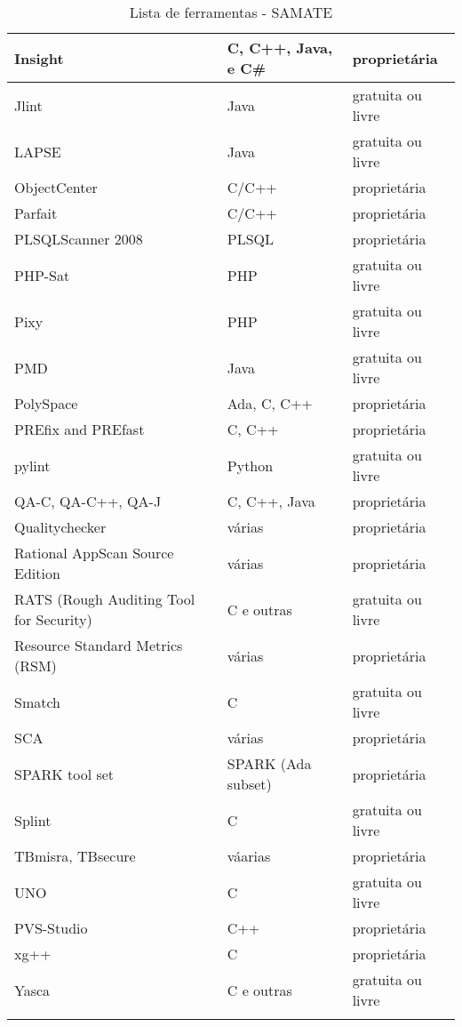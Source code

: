 \begin{center}
\begin{longtable}{ l | l | l }
Insight &   C, C++, Java, e C\#  & proprietária \\ \hline
Jlint &   Java  & gratuita ou livre \\ \hline
LAPSE &   Java  & gratuita ou livre \\ \hline
ObjectCenter &  C/C++  & proprietária \\ \hline
Parfait &   C/C++  & proprietária \\ \hline
PLSQLScanner 2008 &   PLSQL   & proprietária \\ \hline
PHP-Sat &   PHP   & gratuita ou livre \\ \hline
Pixy &  PHP   & gratuita ou livre \\ \hline
PMD &   Java  & gratuita ou livre \\ \hline
PolySpace &   Ada, C, C++   & proprietária \\ \hline
PREfix and PREfast &  C, C++  & proprietária \\ \hline
pylint &  Python  & gratuita ou livre \\ \hline
QA-C, QA-C++, QA-J &  C, C++, Java  & proprietária \\ \hline
Qualitychecker &  várias   & proprietária \\ \hline
Rational AppScan Source Edition &   várias  & proprietária \\ \hline
RATS (Rough Auditing Tool for Security) &   C e outras   & gratuita ou livre \\ \hline
Resource Standard Metrics (RSM) &   várias  & proprietária \\ \hline
Smatch &  C   & gratuita ou livre \\ \hline
SCA &   várias & proprietária \\ \hline
SPARK tool set &  SPARK (Ada subset)  & proprietária \\ \hline
Splint &  C   & gratuita ou livre \\ \hline
TBmisra, TBsecure &  váarias  & proprietária \\ \hline
UNO &   C   & gratuita ou livre \\ \hline
PVS-Studio &  C++   & proprietária \\ \hline
xg++ &  C   & proprietária \\ \hline
Yasca &   C e outras & gratuita ou livre \\
        \hline
        
        \caption{Lista de ferramentas - SAMATE}
        \label{tabela_ferramentas}
        \end{longtable}

        \end{center}
